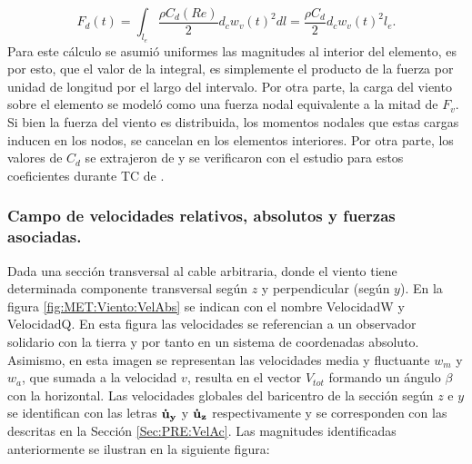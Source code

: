 \begin{equation}
	\label{Eq:MET:FuerzaViento}
	F_d(t)=\int_{l_e}\frac{\rho C_d(Re)}{2}{d_c w_v(t)^2} dl= \frac{\rho C_d}{2}d_c w_v(t)^2l_{e}.
\end{equation}
Para este cálculo se asumió uniformes las magnitudes al interior del elemento, es por esto, que el valor de la integral, es simplemente el producto de la fuerza por unidad de longitud por el largo del intervalo. Por otra parte, la carga del viento sobre el elemento se modeló como una fuerza nodal equivalente a la mitad de $F_v$. Si bien la fuerza del viento es distribuida, los momentos nodales que estas cargas inducen en los nodos, se cancelan en los elementos interiores. Por otra parte, los valores de $C_d$ se extrajeron de \citep{Foti2016} y se verificaron con el estudio para estos coeficientes durante TC de \citep{mara2007effects}. 

\subsubsection{Campo de velocidades relativos, absolutos y fuerzas asociadas.}\label{SubSec:MET:CampoVelRealt}
Dada una sección transversal al cable arbitraria, donde el viento tiene determinada componente transversal según $z$ y perpendicular (según $y$). En la figura \ref{fig:MET:Viento:VelAbs} se indican con el nombre \gls{VelocidadW} y \gls{VelocidadQ}. En esta figura las velocidades se referencian a un observador solidario con la tierra y por tanto en un sistema de coordenadas absoluto. Asimismo, en esta imagen se representan las velocidades media y fluctuante $w_m$ y $w_a$, que sumada a la velocidad $v$, resulta en el vector $V_{tot}$ formando un ángulo $\beta$ con la horizontal. Las velocidades globales del baricentro de la sección según $z$ e $y$ se identifican con las letras $\bf{\dot{u}}_{y}$ y $\bf{\dot{u}}_{z}$ respectivamente y se corresponden con las descritas en la Sección \ref{Sec:PRE:VelAc}. Las magnitudes identificadas anteriormente se ilustran en la siguiente figura:
% 

